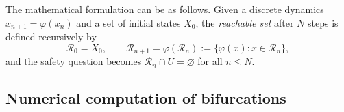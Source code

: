 \documentclass[11pt]{article}
\begin{document}
The mathematical formulation can be as follows. Given a discrete
dynamics $x_{n+1}=\varphi(x_n)$ and a set of initial states
$X_0$, the \emph{reachable set} after $N$ steps is defined
recursively by
\begin{equation}\label{eq:reach}
  \mathcal R_0 = X_0,
  \qquad
  \mathcal R_{n+1} = \varphi(\mathcal R_n)
  := \{\varphi(x) : x\in\mathcal R_n\},
\end{equation}
and the safety question becomes
$\mathcal R_n \cap U = \varnothing$ for all $n\le N$. 

\subsection{Numerical computation of bifurcations}
\end{document}
